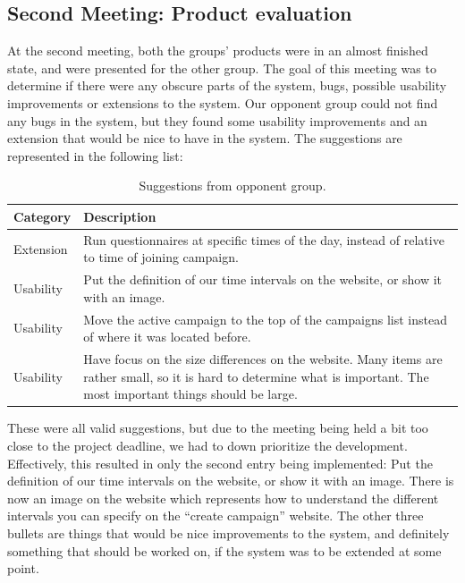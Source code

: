 \subsection{Second Meeting: Product evaluation}
\label{sub:second_meeting_product_evaluation}

At the second meeting, both the groups' products were in an almost finished state, and were presented for the other group. The goal of this meeting was to determine if there were any obscure parts of the system, bugs, possible usability improvements or extensions to the system. Our opponent group could not find any bugs in the system, but they found some usability improvements and an extension that would be nice to have in the system. The suggestions are represented in the following list: 

\begin{table}[!htbp]
    
    \centering
    \begin{tabular}{|l|p{}|}
    \hline
    \textbf{Category} & \textbf{Description} \\ \hline
    Extension & Run questionnaires at specific times of the day, instead of relative to time of joining campaign.  \\ \hline
    Usability & Put the definition of our time intervals on the website, or show it with an image. \\ \hline
    Usability & Move the active campaign to the top of the campaigns list instead of where it was located before. \\ \hline
    Usability & Have focus on the size differences on the website. Many items are rather small, so it is hard to determine what is important. The most important things should be large. \\ \hline
    \end{tabular}
    \caption{Suggestions from opponent group.}
    \label{tab:suggestions_from_opponent_group}
\end{table}

These were all valid suggestions, but due to the meeting being held a bit too close to the project deadline, we had to down prioritize the development. Effectively, this resulted in only the second entry being implemented: Put the definition of our time intervals on the website, or show it with an image. There is now an image on the website which represents how to understand the different intervals you can specify on the ``create campaign'' website. The other three bullets are things that would be nice improvements to the system, and definitely something that should be worked on, if the system was to be extended at some point. 



